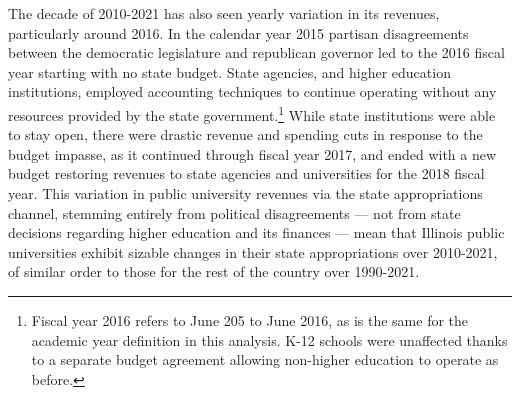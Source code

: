 The decade of 2010-2021 has also seen yearly variation in its revenues, particularly around 2016.
In the calendar year 2015 partisan disagreements between the democratic legislature and republican governor led to the 2016 fiscal year starting with no state budget.
State agencies, and higher education institutions, employed accounting techniques to continue operating without any resources provided by the state government.\footnote{
    Fiscal year 2016 refers to June 205 to June 2016, as is the same for the academic year definition in this analysis. 
    K-12 schools were unaffected thanks to a separate budget agreement allowing non-higher education to operate as before.
}
While state institutions were able to stay open, there were drastic revenue and spending cuts in response to the budget impasse, as it continued through fiscal year 2017, and ended with a new budget restoring revenues to state agencies and universities for the 2018 fiscal year.
This variation in public university revenues via the state appropriations channel, stemming entirely from political disagreements --- not from state decisions regarding higher education and its finances \citep{young2020squandered} --- mean that Illinois public universities exhibit sizable changes in their state appropriations over 2010-2021, of similar order to those for the rest of the country over 1990-2021.

